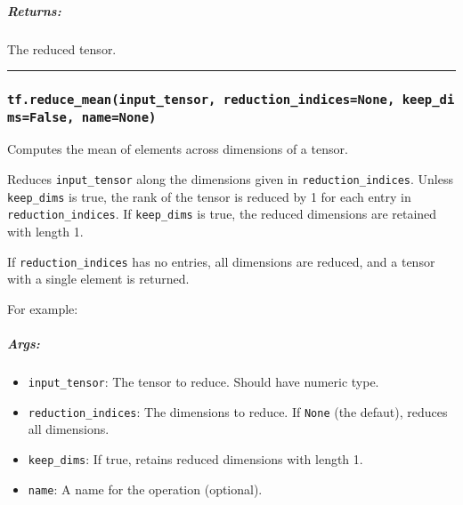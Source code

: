 \subparagraph{Returns: }\label{returns-41}

The reduced tensor.

\begin{center}\rule{0.5\linewidth}{\linethickness}\end{center}

\subsubsection{\texorpdfstring{\texttt{tf.reduce\_mean(input\_tensor,\ reduction\_indices=None,\ keep\_dims=False,\ name=None)}
}{tf.reduce\_mean(input\_tensor, reduction\_indices=None, keep\_dims=False, name=None) }}\label{tf.reduceux5fmeaninputux5ftensor-reductionux5findicesnone-keepux5fdimsfalse-namenone}

Computes the mean of elements across dimensions of a tensor.

Reduces \texttt{input\_tensor} along the dimensions given in
\texttt{reduction\_indices}. Unless \texttt{keep\_dims} is true, the
rank of the tensor is reduced by 1 for each entry in
\texttt{reduction\_indices}. If \texttt{keep\_dims} is true, the reduced
dimensions are retained with length 1.

If \texttt{reduction\_indices} has no entries, all dimensions are
reduced, and a tensor with a single element is returned.

For example:

\begin{Shaded}
\begin{Highlighting}[]
\CommentTok{#         [2., 2.]]}
\OperatorTok{==>} 
\NormalTok{) }\OperatorTok{==>} \NormalTok{[}\NormalTok{, }\NormalTok{]}
\NormalTok{) }\OperatorTok{==>} \NormalTok{[}\NormalTok{.]}
\end{Highlighting}
\end{Shaded}

\subparagraph{Args: }\label{args-42}

\begin{itemize}
\tightlist
\item
  \texttt{input\_tensor}: The tensor to reduce. Should have numeric
  type.
\item
  \texttt{reduction\_indices}: The dimensions to reduce. If
  \texttt{None} (the defaut), reduces all dimensions.
\item
  \texttt{keep\_dims}: If true, retains reduced dimensions with length
  1.
\item
  \texttt{name}: A name for the operation (optional).
\end{itemize}

